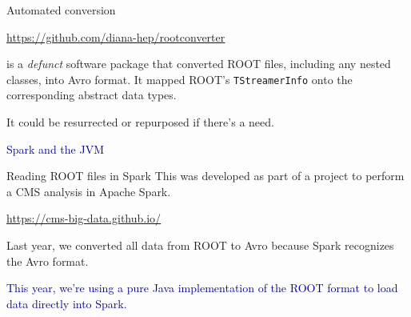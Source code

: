 \documentclass{beamer}
\begin{document}
\begin{frame}{Automated conversion}

\begin{center}
\textcolor{blue}{\underline{\url{https://github.com/diana-hep/rootconverter}}}
\end{center}

is a {\it defunct} software package that converted ROOT files, including any nested classes, into Avro format. It mapped ROOT's {\tt\small TStreamerInfo} onto the corresponding abstract data types.

\vfill
It could be resurrected or repurposed if there's a need.
\end{frame}

\begin{frame}{}
\begin{center}
\LARGE \textcolor{darkblue}{Spark and the JVM}
\end{center}
\end{frame}

\begin{frame}{Reading ROOT files in Spark}
This was developed as part of a project to perform a CMS analysis in Apache Spark.

\begin{center}
\textcolor{blue}{\underline{\url{https://cms-big-data.github.io/}}}
\end{center}

Last year, we converted all data from ROOT to Avro because Spark recognizes the Avro format.

\vfill
\textcolor{darkblue}{This year, we're using a pure Java implementation of the ROOT format to load data directly into Spark.}
\end{frame}
\end{document}
